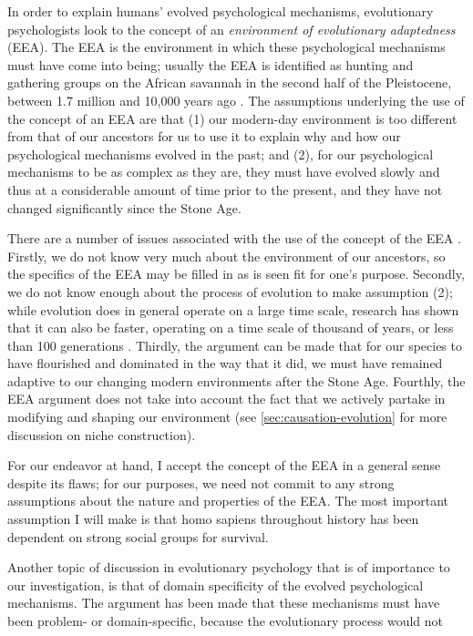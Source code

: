 In order to explain humans' evolved psychological mechanisms, evolutionary psychologists look to the concept of an \emph{environment of evolutionary adaptedness} (EEA). The EEA is the environment in which these psychological mechanisms must have come into being; usually the EEA is identified as hunting and gathering groups on the African savannah in the second half of the Pleistocene, between 1.7 million and 10,000 years ago \citep{LB02}.
The assumptions underlying the use of the concept of an EEA are that (1) our modern-day environment is too different from that of our ancestors for us to use it to explain why and how our psychological mechanisms evolved in the past; and (2), for our psychological mechanisms to be as complex as they are, they must have evolved slowly and thus at a considerable amount of time prior to the present, and they have not changed significantly since the Stone Age.

There are a number of issues associated with the use of the concept of the EEA \citep{LB02}. Firstly, we do not know very much about the environment of our ancestors, so the specifics of the EEA may be filled in as is seen fit for one's purpose. Secondly, we do not know enough about the process of evolution to make assumption (2); while evolution does in general operate on a large time scale, research has shown that it can also be faster, operating on a time scale of thousand of years, or less than 100 generations \citep[pp.~190--191 and references therein]{LB02}. Thirdly, the argument can be made that for our species to have flourished and dominated in the way that it did, we must have remained adaptive to our changing modern environments after the Stone Age. Fourthly, the EEA argument does not take into account the fact that we actively partake in modifying and shaping our environment (see \cref{sec:causation-evolution} for more discussion on niche construction).

For our endeavor at hand, I accept the concept of the EEA in a general sense despite its flaws; for our purposes, we need not commit to any strong assumptions about the nature and properties of the EEA. The most important assumption I will make is that homo sapiens throughout history has been dependent on strong social groups for survival.

Another topic of discussion in evolutionary psychology that is of importance to our investigation, is that of domain specificity of the evolved psychological mechanisms. The argument has been made \citep[p.~50]{Buss15} that these mechanisms must have been problem- or domain-specific, because the evolutionary process would not 

